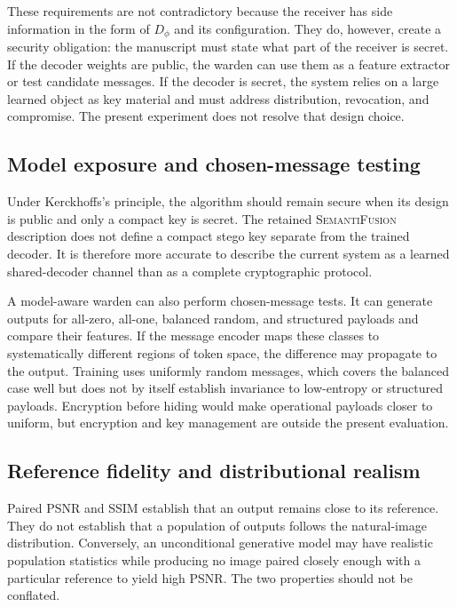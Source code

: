 \documentclass[pdflatex,sn-mathphys-num]{sn-jnl}
\newcommand{\method}{\textsc{SemantiFusion}}
\begin{document}
These requirements are not contradictory because the receiver has side information in the form of $D_{\phi}$ and its configuration. They do, however, create a security obligation: the manuscript must state what part of the receiver is secret. If the decoder weights are public, the warden can use them as a feature extractor or test candidate messages. If the decoder is secret, the system relies on a large learned object as key material and must address distribution, revocation, and compromise. The present experiment does not resolve that design choice.

\subsection{Model exposure and chosen-message testing}

Under Kerckhoffs's principle, the algorithm should remain secure when its design is public and only a compact key is secret. The retained \method{} description does not define a compact stego key separate from the trained decoder. It is therefore more accurate to describe the current system as a learned shared-decoder channel than as a complete cryptographic protocol.

A model-aware warden can also perform chosen-message tests. It can generate outputs for all-zero, all-one, balanced random, and structured payloads and compare their features. If the message encoder maps these classes to systematically different regions of token space, the difference may propagate to the output. Training uses uniformly random messages, which covers the balanced case well but does not by itself establish invariance to low-entropy or structured payloads. Encryption before hiding would make operational payloads closer to uniform, but encryption and key management are outside the present evaluation.

\subsection{Reference fidelity and distributional realism}

Paired PSNR and SSIM establish that an output remains close to its reference. They do not establish that a population of outputs follows the natural-image distribution. Conversely, an unconditional generative model may have realistic population statistics while producing no image paired closely enough with a particular reference to yield high PSNR. The two properties should not be conflated.
\end{document}
